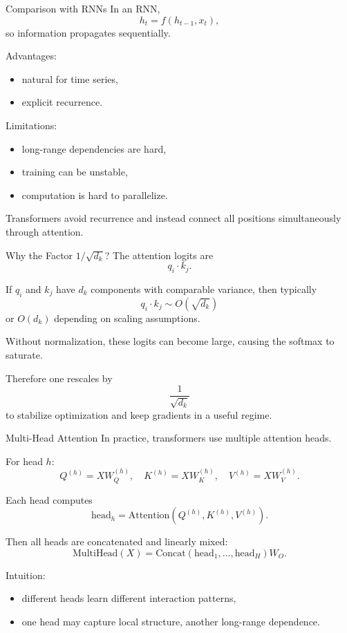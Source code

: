 \documentclass{beamer}
\begin{document}
\begin{frame}{Comparison with RNNs}
  In an RNN,
  \[
  h_t = f(h_{t-1}, x_t),
  \]
  so information propagates sequentially.

  Advantages:
  \begin{itemize}
  \item natural for time series,
  \item explicit recurrence.
  \end{itemize}

  Limitations:
  \begin{itemize}
  \item long-range dependencies are hard,
  \item training can be unstable,
  \item computation is hard to parallelize.
  \end{itemize}

  Transformers avoid recurrence and instead connect all positions simultaneously through attention.
\end{frame}

\begin{frame}{Why the Factor \(1/\sqrt{d_k}\)?}
  The attention logits are
  \[
  q_i \cdot k_j.
  \]

  If \(q_i\) and \(k_j\) have \(d_k\) components with comparable variance, then typically
  \[
  q_i \cdot k_j \sim O(\sqrt{d_k})
  \]
  or \(O(d_k)\) depending on scaling assumptions.

  Without normalization, these logits can become large, causing the softmax to saturate.

  Therefore one rescales by
  \[
  \frac{1}{\sqrt{d_k}}
  \]
  to stabilize optimization and keep gradients in a useful regime.
\end{frame}

\begin{frame}{Multi-Head Attention}
  In practice, transformers use multiple attention heads.

  For head \(h\):
  \[
  Q^{(h)} = XW_Q^{(h)},\quad
  K^{(h)} = XW_K^{(h)},\quad
  V^{(h)} = XW_V^{(h)}.
  \]

  Each head computes
  \[
  \mathrm{head}_h
  =
  \mathrm{Attention}(Q^{(h)},K^{(h)},V^{(h)}).
  \]

  Then all heads are concatenated and linearly mixed:
  \[
  \mathrm{MultiHead}(X)
  =
  \mathrm{Concat}(\mathrm{head}_1,\dots,\mathrm{head}_H)W_O.
  \]

  Intuition:
  \begin{itemize}
  \item different heads learn different interaction patterns,
  \item one head may capture local structure, another long-range dependence.
  \end{itemize}
\end{frame}
\end{document}
